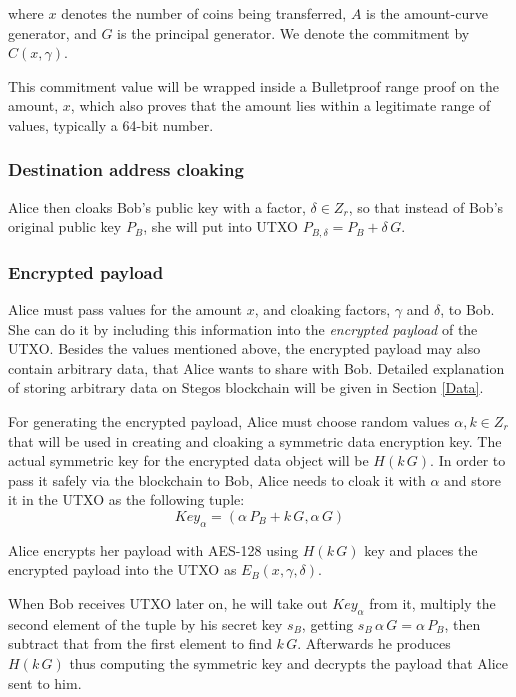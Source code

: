 \documentclass[a4paper, 10pt, conference]{ieeeconf}
\begin{document}
where $x$ denotes the number of coins being transferred, $A$ is the amount-curve generator, and $G$ is the principal generator. We denote the commitment by $C(x, \gamma)$. 

This commitment value will be wrapped inside a Bulletproof range proof on the amount, $x$, which also proves that the amount lies within a legitimate range of values, typically a 64-bit number.

\subsubsection{Destination address cloaking} Alice then cloaks Bob's public key with a factor, $\delta \in Z_r$, so that instead of Bob's original public key $P_B$, she will put into UTXO $P_{B, \delta} = P_B + \delta \, G$.


\subsubsection{Encrypted payload} Alice must pass values for the amount $x$, and cloaking factors, $\gamma$ and $\delta$, to Bob. She can do it by including this information into the \textit{encrypted payload} of the UTXO. Besides the values mentioned above, the encrypted payload may also contain arbitrary data, that Alice wants to share with Bob. Detailed explanation of storing arbitrary data on Stegos blockchain will be given in Section \ref{Data}. 

For generating the encrypted payload, Alice must choose random values $\alpha, k \in Z_r$ that will be used in creating and cloaking a symmetric data encryption key.
The actual symmetric key for the encrypted data object will be $H(k \, G)$. In order to pass it safely via the blockchain to Bob, Alice needs to cloak it with $\alpha$ and store it in the UTXO as the following tuple: $$\mathit{Key}_{\alpha} = (\alpha \, P_{B} + k \, G, \alpha \, G )$$ 

Alice encrypts her payload with AES-128 using $H(k \, G)$ key and places the encrypted payload into the UTXO as $E_B(x, \gamma, \delta)$.

When Bob receives UTXO later on, he will take out $\mathit{Key}_{\alpha}$ from it, multiply the second element of the tuple by his secret key $s_B$, getting $s_B \, \alpha \, G = \alpha \, P_B$, then subtract that from the first element to find $k \, G$. Afterwards he produces $H(k \, G)$ thus computing the symmetric key and decrypts the payload that Alice sent to him.
\end{document}
